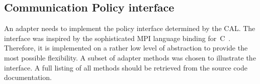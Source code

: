 \subsection{Communication Policy interface}
\label{sec:impl:policy_interface}
An adapter needs to implement the policy interface determined by the
CAL.  The interface was inspired by the sophisticated MPI language
binding for~C~\cite{ref:mpi_c_binding}. Therefore, it is implemented
on a rather low level of abstraction to provide the most possible
flexibility.  A subset of adapter methods was chosen to illustrate
the interface. A full listing of all methods should be retrieved from
the source code documentation.

